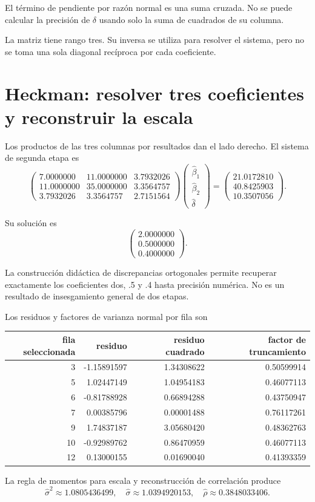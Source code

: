 \documentclass[11pt,a4paper]{article}
\begin{document}
El término de pendiente
por razón normal es
una suma cruzada.
No se puede calcular
la precisión de \(\delta\)
usando solo la suma
de cuadrados de su columna.

La matriz tiene rango tres.
Su inversa se utiliza
para resolver el sistema,
pero no se toma
una sola diagonal recíproca
por cada coeficiente.

\clearpage
\section{Heckman: resolver tres coeficientes y reconstruir la escala}\label{unidad162}
Los productos de las tres
columnas por resultados
dan el lado derecho.
El sistema de segunda etapa es
\[
\begin{pmatrix}7.0000000&11.0000000&3.7932026\\11.0000000&35.0000000&3.3564757\\3.7932026&3.3564757&2.7151564\end{pmatrix}\begin{pmatrix}\widehat\beta_1\\\widehat\beta_2\\\widehat\delta\end{pmatrix}=\begin{pmatrix}21.0172810\\40.8425903\\10.3507056\end{pmatrix}.
\]

Su solución es
\[
\begin{pmatrix}2.0000000\\0.5000000\\0.4000000\end{pmatrix}.
\]

La construcción didáctica de
discrepancias ortogonales permite
recuperar exactamente los
coeficientes dos, .5 y .4
hasta precisión numérica.
No es un resultado
de insesgamiento general
de dos etapas.

Los residuos y factores
de varianza normal por fila
son
\begin{center}\small\begin{tabular}{rrrr}\toprule
fila seleccionada&residuo&residuo cuadrado&factor de truncamiento\\\midrule
3&-1.15891597&1.34308622&0.50599914\\
5&1.02447149&1.04954183&0.46077113\\
6&-0.81788928&0.66894288&0.43750947\\
7&0.00385796&0.00001488&0.76117261\\
9&1.74837187&3.05680420&0.48362763\\
10&-0.92989762&0.86470959&0.46077113\\
12&0.13000155&0.01690040&0.41393359\\\bottomrule\end{tabular}\end{center}
La regla de momentos
para escala y reconstrucción
de correlación produce
\[
\widehat\sigma^2\approx1.0805436499,\quad\widehat\sigma\approx1.0394920153,\quad\widehat\rho\approx0.3848033406.
\]
\end{document}
